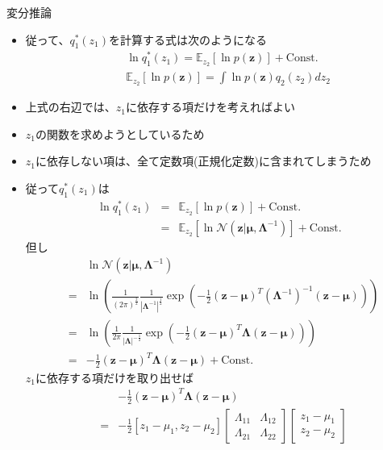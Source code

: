 \documentclass[dvipdfmx,notheorems,t]{beamer}
\begin{document}
\begin{frame}{変分推論}
\begin{itemize}
\begin{itemize}
		\item 従って、$q_1^*(z_1)$を計算する式は次のようになる
		\begin{eqnarray}
			&& \ln q_1^*(z_1) = \mathbb{E}_{z_2}[\ln p(\bm{z})] + \mathrm{Const.} \\
			&& \mathbb{E}_{z_2}[\ln p(\bm{z})] = \int \ln p(\bm{z}) q_2(z_2) dz_2
		\end{eqnarray}
		
		\item 上式の右辺では、$z_1$に依存する項だけを考えればよい
		\item $z_1$の関数を求めようとしているため
		\item $z_1$に依存しない項は、全て定数項(正規化定数)に含まれてしまうため
		\newline
		\item 従って$q_1^*(z_1)$は
		\begin{eqnarray}
			\ln q_1^*(z_1) &=& \mathbb{E}_{z_2}[\ln p(\bm{z})] + \mathrm{Const.} \\
			&=& \mathbb{E}_{z_2} \left[ \ln \mathcal{N}(\bm{z} | \bm{\mu}, \bm{\Lambda}^{-1}) \right] + \mathrm{Const.}
		\end{eqnarray}
		但し
		\begin{eqnarray}
			&& \ln \mathcal{N}(\bm{z} | \bm{\mu}, \bm{\Lambda}^{-1}) \nonumber \\
			&=& \ln \left( \frac{1}{(2\pi)^\frac{2}{2}} \frac{1}{|\bm{\Lambda}^{-1}|^\frac{1}{2}} \exp \left( -\frac{1}{2} (\bm{z} - \bm{\mu})^T \left( \bm{\Lambda}^{-1} \right)^{-1} (\bm{z} - \bm{\mu}) \right) \right) \nonumber \\
			&=& \ln \left( \frac{1}{2\pi} \frac{1}{|\bm{\Lambda}|^{-\frac{1}{2}}} \exp \left( -\frac{1}{2} (\bm{z} - \bm{\mu})^T \bm{\Lambda} (\bm{z} - \bm{\mu}) \right) \right) \nonumber \\
			&=& -\frac{1}{2} (\bm{z} - \bm{\mu})^T \bm{\Lambda} (\bm{z} - \bm{\mu}) + \mathrm{Const.}
		\end{eqnarray}
		$z_1$に依存する項だけを取り出せば
		\begin{eqnarray}
			&& -\frac{1}{2} (\bm{z} - \bm{\mu})^T \bm{\Lambda} (\bm{z} - \bm{\mu}) \nonumber \\
			&=& -\frac{1}{2} \left[ z_1 - \mu_1, z_2 - \mu_2 \right] \left[ \begin{array}{ll} \Lambda_{11} & \Lambda_{12} \\ \Lambda_{21} & \Lambda_{22} \end{array} \right] \left[ \begin{array}{l} z_1 - \mu_1 \\ z_2 - \mu_2 \end{array} \right] \nonumber \\

\end{eqnarray}
\end{itemize}
\end{itemize}
\end{frame}
\end{document}
